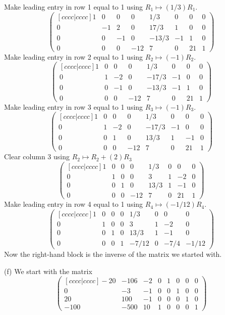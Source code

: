 \documentclass{article}
\begin{document}
Make leading entry in row 1 equal to 1 using
\(R_1\mapsto (1/3)R_1\). \[\begin{pmatrix}[ c c c c | c c c c ] 1 & 0
& 0 & 0 & 1/3 & 0 & 0 & 0 \\ 0 & -1 & 2 & 0 & 17/3 & 1 & 0 & 0 \\ 0 &
0 & -1 & 0 & -13/3 & -1 & 1 & 0 \\ 0 & 0 & 0 & -12 & 7 & 0 & 21 & 1
\end{pmatrix}\]Make leading entry in row 2 equal to 1 using
\(R_2\mapsto (-1)R_2\). \[\begin{pmatrix}[ c c c c | c c c c ] 1 & 0
& 0 & 0 & 1/3 & 0 & 0 & 0 \\ 0 & 1 & -2 & 0 & -17/3 & -1 & 0 & 0 \\ 0
& 0 & -1 & 0 & -13/3 & -1 & 1 & 0 \\ 0 & 0 & 0 & -12 & 7 & 0 & 21 & 1
\end{pmatrix}\]Make leading entry in row 3 equal to 1 using
\(R_3\mapsto (-1)R_3\). \[\begin{pmatrix}[ c c c c | c c c c ] 1 & 0
& 0 & 0 & 1/3 & 0 & 0 & 0 \\ 0 & 1 & -2 & 0 & -17/3 & -1 & 0 & 0 \\ 0
& 0 & 1 & 0 & 13/3 & 1 & -1 & 0 \\ 0 & 0 & 0 & -12 & 7 & 0 & 21 & 1
\end{pmatrix}\]Clear column 3 using \(R_2\mapsto
R_2+(2)R_3\)\[\begin{pmatrix}[ c c c c | c c c c ] 1 & 0 & 0 & 0 & 1/3
& 0 & 0 & 0 \\ 0 & 1 & 0 & 0 & 3 & 1 & -2 & 0 \\ 0 & 0 & 1 & 0 & 13/3
& 1 & -1 & 0 \\ 0 & 0 & 0 & -12 & 7 & 0 & 21 & 1 \end{pmatrix}\]Make
leading entry in row 4 equal to 1 using \(R_4\mapsto (-1/12)R_4\).
\[\begin{pmatrix}[ c c c c | c c c c ] 1 & 0 & 0 & 0 & 1/3 & 0 & 0 & 0
\\ 0 & 1 & 0 & 0 & 3 & 1 & -2 & 0 \\ 0 & 0 & 1 & 0 & 13/3 & 1 & -1 & 0
\\ 0 & 0 & 0 & 1 & -7/12 & 0 & -7/4 & -1/12 \end{pmatrix}\]Now the
right-hand block is the inverse of the matrix we started with.


\newpage


(f) We start with the matrix \[\begin{pmatrix}[ c c c c | c c c c ]
-20 & -106 & -2 & 0 & 1 & 0 & 0 & 0 \\ 0 & -3 & -1 & 0 & 0 & 1 & 0 & 0
\\ 20 & 100 & -1 & 0 & 0 & 0 & 1 & 0 \\ -100 & -500 & 10 & 1 & 0 & 0 &
0 & 1 \end{pmatrix}\]
\end{document}
